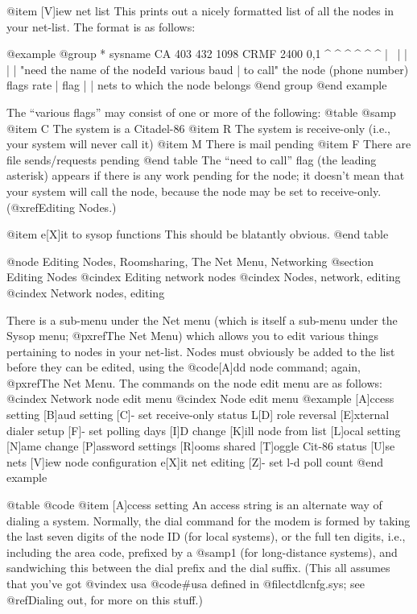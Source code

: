@item [V]iew net list
This prints out a nicely formatted list of all the nodes
in your net-list.  The format is as follows:

@example
@group
* sysname              CA 403 432 1098      CRMF  2400 0,1
^       ^               ^                    ^      ^   ^
|        \              |                    |      |   |
"need     the name of   the nodeId      various   baud  |
to call"  the node     (phone number)    flags    rate  |
 flag                                                   |
                                                        |
                            nets to which the node belongs
@end group
@end example

The ``various flags'' may consist of one or more of the
following:
@table @samp
@item C
The system is a Citadel-86
@item R
The system is receive-only (i.e., your system will
never call it)
@item M
There is mail pending
@item F
There are file sends/requests pending
@end table
The ``need to call'' flag (the leading asterisk) appears if
there is any work pending for the node; it doesn't mean that your
system will call the node, because the node may be set to receive-only.
(@xref{Editing Nodes}.)

@item e[X]it to sysop functions
This should be blatantly obvious.
@end table

@node Editing Nodes, Roomsharing, The Net Menu, Networking
@section Editing Nodes
@cindex Editing network nodes
@cindex Nodes, network, editing
@cindex Network nodes, editing

There is a sub-menu under the Net menu (which is itself a sub-menu
under the Sysop menu; @pxref{The Net Menu}) which allows you to edit
various things pertaining to nodes in your net-list.  Nodes must obviously
be added to the list before they can be edited, using the @code{[A]dd node}
command; again, @pxref{The Net Menu}.
The commands on the node edit menu are as follows:
@cindex Network node edit menu
@cindex Node edit menu
@example
[A]ccess setting
[B]aud setting
[C]- set receive-only status
L[D] role reversal
[E]xternal dialer setup
[F]- set polling days
[I]D change
[K]ill node from list
[L]ocal setting
[N]ame change
[P]assword settings
[R]ooms shared
[T]oggle Cit-86 status
[U]se nets
[V]iew node configuration
e[X]it net editing
[Z]- set l-d poll count
@end example

@table @code
@item [A]ccess setting
An access string is an alternate way of dialing a system.
Normally, the dial command for the modem is formed by taking the
last seven digits of the node ID (for local systems), or the full
ten digits, i.e., including the area code, prefixed by a @samp{1} (for
long-distance systems), and sandwiching this between the dial
prefix and the dial suffix.  (This all assumes that you've got
@vindex usa
@code{#usa} defined in @file{ctdlcnfg.sys}; see @ref{Dialing out},
for more on this stuff.)


